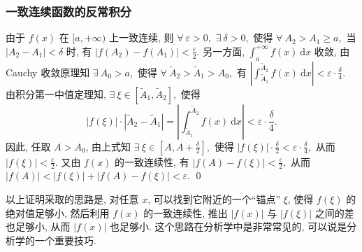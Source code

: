 \begin{frame}
\frametitle{一致连续函数的反常积分}

\startproof[bg=yellow, fg=red]
由于 $f(x)$ 在 $[a, +\infty)$ 上一致连续, 则 $\forall ~ \varepsilon > 0,$ $\exists ~ \delta > 0,$ 使得 $\forall ~ A_2 > A_1 \geqslant a,$ 当 $|A_2 - A_1| < \delta$ 时, 有 $|f(A_2) - f(A_1)| < \frac{\varepsilon}{2}.$
\pause
另一方面, $\displaystyle \int_a^{+\infty} f(x) ~ \mathrm{d} x$ 收敛, 由 Cauchy 收敛原理知 $\exists ~ A_0 > a,$ 使得 $\forall ~ \widetilde{A}_2 > \widetilde{A}_1 > A_0,$ 有 $\left| \int_{\widetilde{A}_1}^{\widetilde{A}_2} f(x) ~ \mathrm{d} x \right| < \varepsilon \cdot \frac{\delta}{4}.$ 由积分第一中值定理知, $\exists ~ \xi \in [\widetilde{A}_1, \widetilde{A}_2],$ 使得
\[
\left| f(\xi) \right| \cdot |\widetilde{A}_2 - \widetilde{A}_1| = \left| \int_{\widetilde{A}_1}^{\widetilde{A}_2} f(x) ~ \mathrm{d} x \right| < \varepsilon \cdot \frac{\delta}{4}.
\]
因此, 任取 $A > A_0$, 由上式知 $\exists ~ \xi \in \left[ A, A + \frac{\delta}{2} \right],$ 使得 $|f(\xi)| \cdot \frac{\delta}{2} < \varepsilon \cdot \frac{\delta}{4},$ 从而 $|f(\xi)| < \frac{\varepsilon}{2}.$
\pause
又由 $f(x)$ 的一致连续性, 有 $|f(A) - f(\xi)| < \frac{\varepsilon}{2},$ 从而 $|f(A)| < |f(\xi)| + |f(A) - f(\xi)| < \varepsilon.$
\qed

\pause

\begin{remark}
以上证明采取的思路是, 对任意 $x$, 可以找到它附近的一个``锚点'' $\xi$, 使得 $f(\xi)$ 的绝对值足够小, 然后利用 $f(x)$ 的一致连续性, 推出 $|f(x)|$ 与 $|f(\xi)|$ 之间的差也足够小, 从而 $|f(x)|$ 也足够小. 这个思路在分析学中是非常常见的, 可以说是分析学的一个重要技巧.
\end{remark}

\end{frame}



